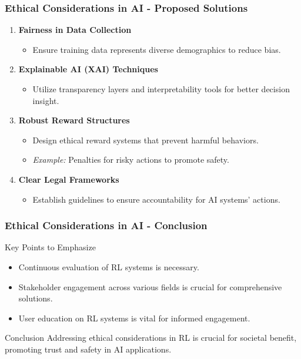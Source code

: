 \documentclass[aspectratio=169]{beamer}
\begin{document}
\begin{frame}[fragile]
    \frametitle{Ethical Considerations in AI - Proposed Solutions}
    \begin{enumerate}
        \item \textbf{Fairness in Data Collection}
            \begin{itemize}
                \item Ensure training data represents diverse demographics to reduce bias.
            \end{itemize}
        \item \textbf{Explainable AI (XAI) Techniques}
            \begin{itemize}
                \item Utilize transparency layers and interpretability tools for better decision insight.
            \end{itemize}
        \item \textbf{Robust Reward Structures}
            \begin{itemize}
                \item Design ethical reward systems that prevent harmful behaviors.
                \item \textit{Example:} Penalties for risky actions to promote safety.
            \end{itemize}
        \item \textbf{Clear Legal Frameworks}
            \begin{itemize}
                \item Establish guidelines to ensure accountability for AI systems' actions.
            \end{itemize}
    \end{enumerate}
\end{frame}

\begin{frame}[fragile]
    \frametitle{Ethical Considerations in AI - Conclusion}
    \begin{block}{Key Points to Emphasize}
        \begin{itemize}
            \item Continuous evaluation of RL systems is necessary.
            \item Stakeholder engagement across various fields is crucial for comprehensive solutions.
            \item User education on RL systems is vital for informed engagement.
        \end{itemize}
    \end{block}
    \begin{block}{Conclusion}
        Addressing ethical considerations in RL is crucial for societal benefit, promoting trust and safety in AI applications.
    \end{block}
\end{frame}
\end{document}
